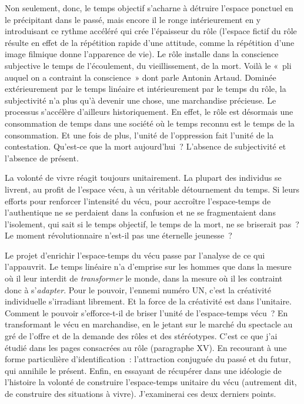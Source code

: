 \documentclass[french,twoside]{book} %
\newcommand{\astermono}{\medskip\centerline{\color{rubric}\large\selectfont{\syms ✻}}\medskip\par}%
\begin{document}
Non seulement, donc, le temps objectif s’acharne à détruire l’espace ponctuel en le précipitant dans le passé, mais encore il le ronge intérieurement en y introduisant ce rythme accéléré qui crée l’épaisseur du rôle (l’espace fictif du rôle résulte en effet de la répétition rapide d’une attitude, comme la répétition d’une image filmique donne l’apparence de vie). Le rôle installe dans la conscience subjective le temps de l’écoulement, du vieillissement, de la mort. Voilà le « pli auquel on a contraint la conscience » dont parle Antonin Artaud. Dominée extérieurement par le temps linéaire et intérieurement par le temps du rôle, la subjectivité n’a plus qu’à devenir une chose, une marchandise précieuse. Le processus s’accélère d’ailleurs historiquement. En effet, le rôle est désormais une consommation de temps dans une société où le temps reconnu est le temps de la consommation. Et une fois de plus, l’unité de l’oppression fait l’unité de la contestation. Qu’est-ce que la mort aujourd’hui ? L’absence de subjectivité et l’absence de présent.\par
La volonté de vivre réagit toujours unitairement. La plupart des individus se livrent, au profit de l’espace vécu, à un véritable détournement du temps. Si leurs efforts pour renforcer l’intensité du vécu, pour accroître l’espace-temps de l’authentique ne se perdaient dans la confusion et ne se fragmentaient dans l’isolement, qui sait si le temps objectif, le temps de la mort, ne se briserait pas ? Le moment révolutionnaire n’est-il pas une éternelle jeunesse ?\par

\astermono

\noindent Le projet d’enrichir l’espace-temps du vécu passe par l’analyse de ce qui l’appauvrit. Le temps linéaire n’a d’emprise sur les hommes que dans la mesure où il leur interdit de \emph{transformer} le monde, dans la mesure où il les contraint donc à s’\emph{adapter}. Pour le pouvoir, l’ennemi numéro UN, c’est la créativité individuelle s’irradiant librement. Et la force de la créativité est dans l’unitaire. Comment le pouvoir s’efforce-t-il de briser l’unité de l’espace-temps vécu ? En transformant le vécu en marchandise, en le jetant sur le marché du spectacle au gré de l’offre et de la demande des rôles et des stéréotypes. C’est ce que j’ai étudié dans les pages consacrées au rôle (paragraphe XV). En recourant à une forme particulière d’identification : l’attraction conjuguée du passé et du futur, qui annihile le présent. Enfin, en essayant de récupérer dans une idéologie de l’histoire la volonté de construire l’espace-temps unitaire du vécu (autrement dit, de construire des situations à vivre). J’examinerai ces deux derniers points.\par
\end{document}

